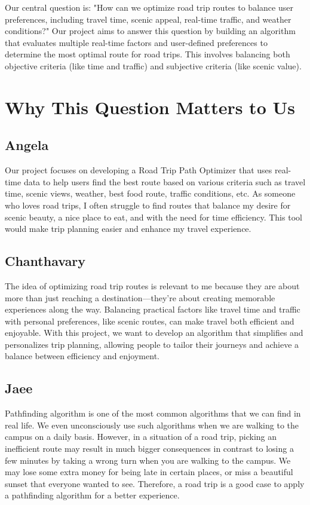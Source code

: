 \documentclass{article}
\begin{document}
Our central question is: "How can we optimize road trip routes to balance user preferences, including travel time, scenic appeal, real-time traffic, and weather conditions?" Our project aims to answer this question by building an algorithm that evaluates multiple real-time factors and user-defined preferences to determine the most optimal route for road trips. This involves balancing both objective criteria (like time and traffic) and subjective criteria (like scenic value).

\section{Why This Question Matters to Us}

\subsection{Angela}
Our project focuses on developing a Road Trip Path Optimizer that uses real-time data to help users find the best route based on various criteria such as travel time, scenic views, weather, best food route, traffic conditions, etc. As someone who loves road trips, I often struggle to find routes that balance my desire for scenic beauty, a nice place to eat, and with the need for time efficiency. This tool would make trip planning easier and enhance my travel experience.

\subsection{Chanthavary}
The idea of optimizing road trip routes is relevant to me because they are about more than just reaching a destination—they’re about creating memorable experiences along the way. Balancing practical factors like travel time and traffic with personal preferences, like scenic routes, can make travel both efficient and enjoyable. With this project, we want to develop an algorithm that simplifies and personalizes trip planning, allowing people to tailor their journeys and achieve a balance between efficiency and enjoyment.

\subsection{Jaee}
Pathfinding algorithm is one of the most common algorithms that we can find in real life. We even unconsciously use such algorithms when we are walking to the campus on a daily basis. However, in a situation of a road trip, picking an inefficient route may result in much bigger consequences in contrast to losing a few minutes by taking a wrong turn when you are walking to the campus. We may lose some extra money for being late in certain places, or miss a beautiful sunset that everyone wanted to see. Therefore, a road trip is a good case to apply a pathfinding algorithm for a better experience.
\end{document}
